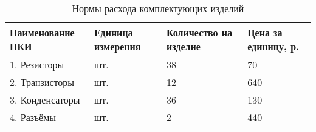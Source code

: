 \begin{table}[h!]
  \caption{Нормы расхода комплектующих изделий}
  \label{tbl:set_costs}
  \centering
  \small{
    \begin{tabular}{| p{} | p{} |
                      p{} | p{} |}
      \hline
      Наименование ПКИ & Единица \newline измерения &
      Количество \newline на изделие & Цена за единицу, \newline р. \\ \hline

      1. Резисторы                & шт. & 38 & 70   \\ \hline
      2. Транзисторы              & шт. & 12 & 640  \\ \hline
      3. Конденсаторы             & шт. & 36 & 130  \\ \hline
      4. Разъёмы                  & шт. & 2  & 440  \\ \hline

    \end{tabular}
  }
\end{table}

